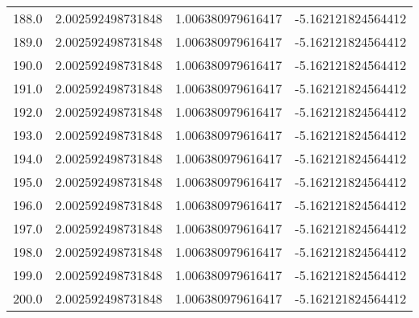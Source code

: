 \begin{longtable}{lrrr}
188.0 & 2.002592498731848 & 1.006380979616417 & -5.162121824564412 \\
189.0 & 2.002592498731848 & 1.006380979616417 & -5.162121824564412 \\
190.0 & 2.002592498731848 & 1.006380979616417 & -5.162121824564412 \\
191.0 & 2.002592498731848 & 1.006380979616417 & -5.162121824564412 \\
192.0 & 2.002592498731848 & 1.006380979616417 & -5.162121824564412 \\
193.0 & 2.002592498731848 & 1.006380979616417 & -5.162121824564412 \\
194.0 & 2.002592498731848 & 1.006380979616417 & -5.162121824564412 \\
195.0 & 2.002592498731848 & 1.006380979616417 & -5.162121824564412 \\
196.0 & 2.002592498731848 & 1.006380979616417 & -5.162121824564412 \\
197.0 & 2.002592498731848 & 1.006380979616417 & -5.162121824564412 \\
198.0 & 2.002592498731848 & 1.006380979616417 & -5.162121824564412 \\
199.0 & 2.002592498731848 & 1.006380979616417 & -5.162121824564412 \\
200.0 & 2.002592498731848 & 1.006380979616417 & -5.162121824564412 \\
\end{longtable}